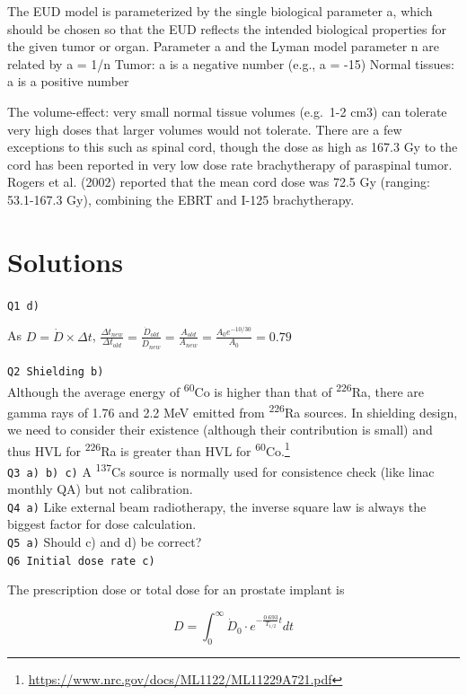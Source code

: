 \documentclass[]{book}
\let\rmarkdownfootnote\footnote%
\def\footnote{\protect\rmarkdownfootnote}
\theoremstyle{definition}
\theoremstyle{definition}
\theoremstyle{definition}
\theoremstyle{remark}
\begin{document}
The EUD model is parameterized by the single biological parameter a,
which should be chosen so that the EUD reflects the intended biological
properties for the given tumor or organ. Parameter a and the Lyman model
parameter n are related by a = 1/n Tumor: a is a negative number (e.g.,
a = -15) Normal tissues: a is a positive number

The volume-effect: very small normal tissue volumes (e.g.~1-2 cm3) can
tolerate very high doses that larger volumes would not tolerate. There
are a few exceptions to this such as spinal cord, though the dose as
high as 167.3 Gy to the cord has been reported in very low dose rate
brachytherapy of paraspinal tumor. Rogers et al. (2002) reported that
the mean cord dose was 72.5 Gy (ranging: 53.1-167.3 Gy), combining the
EBRT and I-125 brachytherapy.

\section{Solutions}\label{ldr-solutions}

\texttt{Q1\ d)}

As \(D = \dot D\times\Delta t\),
\(\frac{\Delta t_{new}}{\Delta t_{old}}=\frac{\dot D_{old}}{\dot D_{new}} = \frac{A_{old}}{A_{new}} = \frac{A_0e^{-10/30}}{A_0} = 0.79\)

\texttt{Q2\ Shielding\ b)}\\
Although the average energy of \textsuperscript{60}Co is higher than
that of \textsuperscript{226}Ra, there are gamma rays of 1.76 and 2.2
MeV emitted from \textsuperscript{226}Ra sources. In shielding design,
we need to consider their existence (although their contribution is
small) and thus HVL for \textsuperscript{226}Ra is greater than HVL for
\textsuperscript{60}Co.\footnote{\url{https://www.nrc.gov/docs/ML1122/ML11229A721.pdf}}\\
\texttt{Q3\ a)\ b)\ c)} A \textsuperscript{137}Cs source is normally
used for consistence check (like linac monthly QA) but not
calibration.\\
\texttt{Q4\ a)} Like external beam radiotherapy, the inverse square law
is always the biggest factor for dose calculation.\\
\texttt{Q5\ a)} Should c) and d) be correct?\\
\texttt{Q6\ Initial\ dose\ rate\ c)}

The prescription dose or total dose for an prostate implant is

\begin{equation*}
D = \int^{\infty}_0 \dot D_0 \cdot e^{-\frac{0.693}{T_{1/2}}t}dt
\end{equation*}
\end{document}
